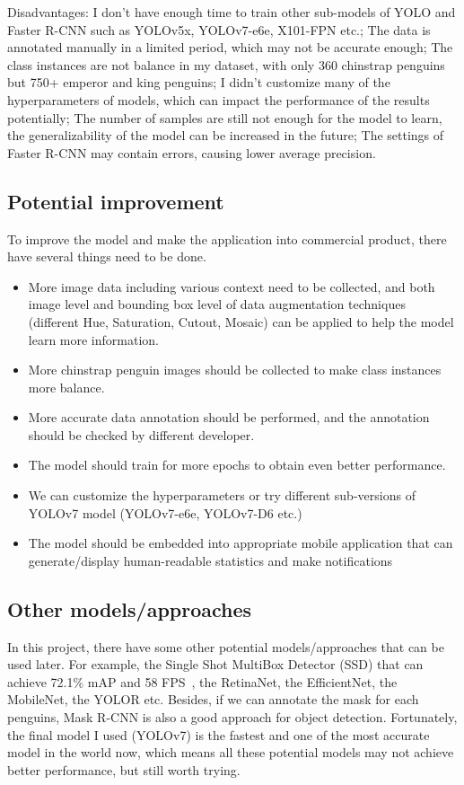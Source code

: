 \documentclass[runningheads]{llncs}
\begin{document}
Disadvantages: I don't have enough time to train other sub-models of YOLO and Faster R-CNN such as YOLOv5x, YOLOv7-e6e, X101-FPN etc.; The data is annotated manually in a limited period, which may not be accurate enough; The class instances are not balance in my dataset, with only 360 chinstrap penguins but 750+ emperor and king penguins; I didn't customize many of the hyperparameters of models, which can impact the performance of the results potentially; The number of samples are still not enough for the model to learn, the generalizability of the model can be increased in the future; The settings of Faster R-CNN may contain errors, causing lower average precision.

\subsection{Potential improvement}
To improve the model and make the application into commercial product, there have several things need to be done. 
\begin{itemize}
    \item More image data including various context need to be collected, and both image level and bounding box level of data augmentation techniques (different Hue, Saturation, Cutout, Mosaic) can be applied to help the model learn more information.
    \item More chinstrap penguin images should be collected to make class instances more balance.
    \item More accurate data annotation should be performed, and the annotation should be checked by different developer.
    \item The model should train for more epochs to obtain even better performance.
    \item We can customize the hyperparameters or try different sub-versions of YOLOv7 model (YOLOv7-e6e, YOLOv7-D6 etc.)
    \item The model should be embedded into appropriate mobile application that can generate/display human-readable statistics and make notifications
\end{itemize}


\subsection{Other models/approaches}
In this project, there have some other potential models/approaches that can be used later. For example, the Single Shot MultiBox Detector (SSD) that can achieve 72.1\% mAP and 58 FPS~\cite{ssd}, the RetinaNet, the EfficientNet, the MobileNet, the YOLOR etc. Besides, if we can annotate the mask for each penguins, Mask R-CNN is also a good approach for object detection. Fortunately, the final model I used (YOLOv7) is the fastest and one of the most accurate model in the world now, which means all these potential models may not achieve better performance, but still worth trying. 
\end{document}
